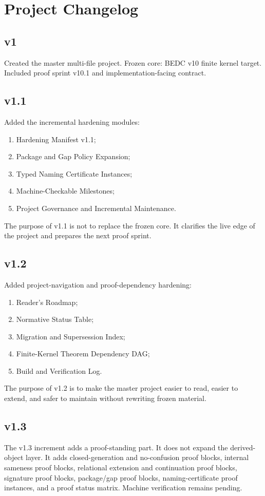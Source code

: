 \chapter{Project Changelog}

\section*{v1}
Created the master multi-file project. Frozen core: BEDC v10 finite kernel target. Included proof sprint v10.1 and implementation-facing contract.

\section*{v1.1}
Added the incremental hardening modules:
\begin{enumerate}
  \item Hardening Manifest v1.1;
  \item Package and Gap Policy Expansion;
  \item Typed Naming Certificate Instances;
  \item Machine-Checkable Milestones;
  \item Project Governance and Incremental Maintenance.
\end{enumerate}
The purpose of v1.1 is not to replace the frozen core. It clarifies the live edge of the project and prepares the next proof sprint.


\section*{v1.2}
Added project-navigation and proof-dependency hardening:
\begin{enumerate}
  \item Reader's Roadmap;
  \item Normative Status Table;
  \item Migration and Supersession Index;
  \item Finite-Kernel Theorem Dependency DAG;
  \item Build and Verification Log.
\end{enumerate}
The purpose of v1.2 is to make the master project easier to read, easier to extend, and safer to maintain without rewriting frozen material.


\section*{v1.3}
The v1.3 increment adds a proof-standing part. It does not expand the derived-object layer. It adds closed-generation and no-confusion proof blocks, internal sameness proof blocks, relational extension and continuation proof blocks, signature proof blocks, package/gap proof blocks, naming-certificate proof instances, and a proof status matrix. Machine verification remains pending.

